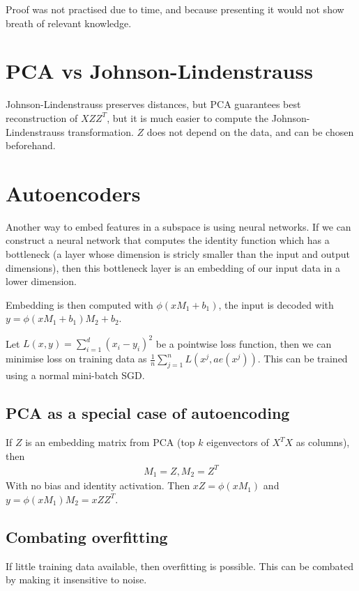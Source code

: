 \documentclass{article}
\begin{document}
    Proof was not practised due to time, and because presenting it would not show breath of relevant knowledge. 


\section{PCA vs Johnson-Lindenstrauss}
Johnson-Lindenstrauss preserves distances, but PCA guarantees best reconstruction of $XZZ^T$, but it is much easier to compute the Johnson-Lindenstrauss transformation. $Z$ does not depend on the data, and can be chosen beforehand. 



\section{Autoencoders}
  Another way to embed features in a subspace is using neural networks. If we can construct a neural network that computes the identity function which has a bottleneck (a layer whose dimension is stricly smaller than the input and output dimensions), then this bottleneck layer is an embedding of our input data in a lower dimension. 

  Embedding is then computed with $\phi(xM_1 + b_1)$, the input is decoded with $y = \phi(xM_1 + b_1)M_2 + b_2$. 
  
  Let $L(x, y) = \sum_{i=1}^{d}(x_i - y_i)^2$ be a pointwise loss function, then we can minimise loss on training data as $\frac{1}{n}\sum_{j=1}^{n}{L(x^j, ae(x^j))}$. This can be trained using a normal mini-batch SGD.
  
  \subsection{PCA as a special case of autoencoding}
    If $Z$ is an embedding matrix from PCA (top $k$ eigenvectors of $X^TX$ as columns), then 
    \begin{align}
      M_1 = Z, M_2 = Z^T
    \end{align}
    With no bias and identity activation. Then $xZ = \phi(xM_1)$ and $y = \phi(xM_1)M_2 = xZZ^T$. 

    \subsection{Combating overfitting}
      If little training data available, then overfitting is possible. This can be combated by making it insensitive to noise.
\end{document}
